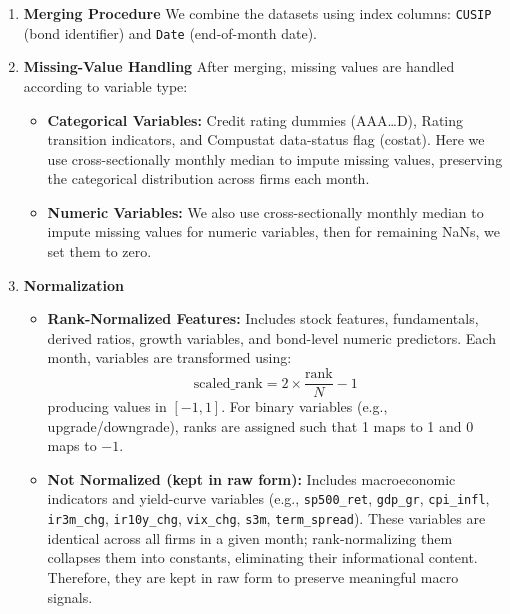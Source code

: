 \documentclass[12pt]{article}
\begin{document}
\begin{enumerate}
    \item \textbf{Merging Procedure}
    We combine the datasets using index columns: \texttt{CUSIP} (bond identifier) and \texttt{Date} (end-of-month date).

    \item \textbf{Missing-Value Handling}
    After merging, missing values are handled according to variable type:
    \begin{itemize}
        \item \textbf{Categorical Variables:} Credit rating dummies (AAA\dots D), Rating transition indicators, and Compustat data-status flag (costat). Here we use cross-sectionally monthly median to impute missing values, preserving the categorical distribution across firms each month.
        \item \textbf{Numeric Variables:} We also use cross-sectionally monthly median to impute missing values for numeric variables, then for remaining NaNs, we set them to zero.
    \end{itemize}

    \item \textbf{Normalization}
    \begin{itemize}
        \item \textbf{Rank-Normalized Features:} Includes stock features, fundamentals, derived ratios, growth variables, and bond-level numeric predictors. Each month, variables are transformed using:
        \begin{equation}
        \text{scaled\_rank} = 2 \times \frac{\text{rank}}{N} - 1
        \end{equation}
        producing values in $[-1, 1]$. For binary variables (e.g., upgrade/downgrade), ranks are assigned such that 1 maps to 1 and 0 maps to $-1$.
        
        \item \textbf{Not Normalized (kept in raw form):} Includes macroeconomic indicators and yield-curve variables (e.g., \texttt{sp500\_ret}, \texttt{gdp\_gr}, \texttt{cpi\_infl}, \texttt{ir3m\_chg}, \texttt{ir10y\_chg}, \texttt{vix\_chg}, \texttt{s3m}, \texttt{term\_spread}). These variables are identical across all firms in a given month; rank-normalizing them collapses them into constants, eliminating their informational content. Therefore, they are kept in raw form to preserve meaningful macro signals.
    \end{itemize}
\end{enumerate}
\end{document}

